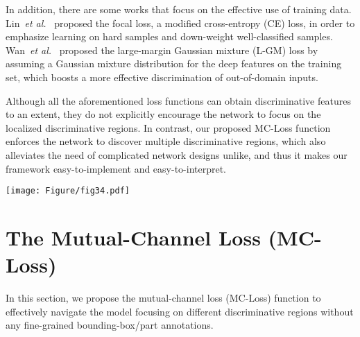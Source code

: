 \documentclass[journal]{IEEEtran}
\begin{document}
In addition, there are some works that focus on the effective use of training data. Lin~\emph{et al.}~\cite{lin2017focal} proposed the focal loss, a modified cross-entropy (CE) loss, in order to emphasize learning on hard samples and down-weight well-classified samples. Wan~\emph{et al.}~\cite{wan2018rethinking} proposed the large-margin Gaussian mixture (L-GM) loss by assuming a Gaussian mixture distribution for the deep features on the training set, which boosts a more effective discrimination of out-of-domain inputs.

Although all the aforementioned loss functions can obtain discriminative features to an extent, they do not explicitly encourage the network to focus on the localized discriminative regions. In contrast, our proposed MC-Loss function enforces the network to discover multiple discriminative regions, which also alleviates the need of complicated network designs unlike\cite{zhang2016picking,wang2015multiple,zheng2017learning}, and thus it makes our framework easy-to-implement and easy-to-interpret.









\begin{figure*}[!t]
  \begin{center}
    \texttt{[image: Figure/fig34.pdf]}
  \end{center}
  \caption{(a) Overview of the MC-Loss. The MC-Loss consists of (i) a discriminality component (left) that makes $\mathcal{F}$ to be class-aligned and discriminative, and (ii) a diversity component (right) that supervises the feature channels to focus on different local regions. (b) Comparison of feature maps before (left) and after (right) applying MC-Loss, where feature channels become class aligned, and each attending to different discriminate parts.~\textbf{Please refer to Section~\ref{Methods} for details.}
  }
  \label{fig:MCloss}
\end{figure*}

\section{The Mutual-Channel Loss (MC-Loss)}\label{Methods}




In this section, we propose the mutual-channel loss (MC-Loss) function to effectively navigate the model focusing on different discriminative regions without any fine-grained bounding-box/part annotations.
\end{document}
